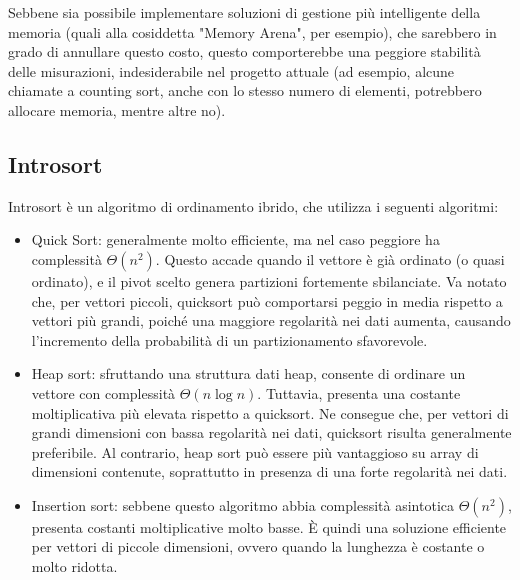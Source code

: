 \documentclass{article}
\begin{document}
            Sebbene sia possibile implementare soluzioni di gestione più intelligente della memoria (quali alla cosiddetta "Memory Arena", per esempio), che sarebbero in grado di annullare questo costo, questo comporterebbe una peggiore stabilità delle misurazioni, indesiderabile nel progetto attuale (ad esempio, alcune chiamate a counting sort, anche con lo stesso numero di elementi, potrebbero allocare memoria, mentre altre no).

    \subsection{Introsort}
        Introsort è un algoritmo di ordinamento ibrido, che utilizza i seguenti algoritmi:
        \begin{itemize}
            \item Quick Sort: generalmente molto efficiente, ma nel caso peggiore ha complessità $\Theta(n^2)$. Questo accade quando il vettore è già ordinato (o quasi ordinato), e il pivot scelto genera partizioni fortemente sbilanciate. Va notato che, per vettori piccoli, quicksort può comportarsi peggio in media rispetto a vettori più grandi, poiché una maggiore regolarità nei dati aumenta, causando l'incremento della probabilità di un partizionamento sfavorevole.
            \item Heap sort: sfruttando una struttura dati heap, consente di ordinare un vettore con complessità $\Theta(n \log n)$. Tuttavia, presenta una costante moltiplicativa più elevata rispetto a quicksort. Ne consegue che, per vettori di grandi dimensioni con bassa regolarità nei dati, quicksort risulta generalmente preferibile. Al contrario, heap sort può essere più vantaggioso su array di dimensioni contenute, soprattutto in presenza di una forte regolarità nei dati.
            \item Insertion sort: sebbene questo algoritmo abbia complessità asintotica $\Theta(n^2)$, presenta costanti moltiplicative molto basse. È quindi una soluzione efficiente per vettori di piccole dimensioni, ovvero quando la lunghezza è costante o molto ridotta.
        \end{itemize}
\end{document}

